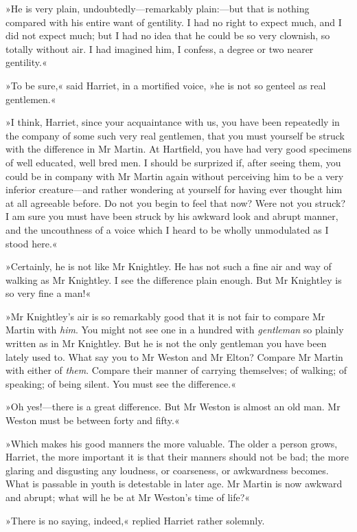 »He is very plain, undoubtedly—remarkably plain:—but that is nothing compared with his entire want of gentility. I had no right to expect much, and I did not expect much; but I had no idea that he could be so very clownish, so totally without air. I had imagined him, I confess, a degree or two nearer gentility.«

»To be sure,« said Harriet, in a mortified voice, »he is not so genteel as real gentlemen.«

»I think, Harriet, since your acquaintance with us, you have been repeatedly in the company of some such very real gentlemen, that you must yourself be struck with the difference in Mr Martin. At Hartfield, you have had very good specimens of well educated, well bred men. I should be surprized if, after seeing them, you could be in company with Mr Martin again without perceiving him to be a very inferior creature—and rather wondering at yourself for having ever thought him at all agreeable before. Do not you begin to feel that now? Were not you struck? I am sure you must have been struck by his awkward look and abrupt manner, and the uncouthness of a voice which I heard to be wholly unmodulated as I stood here.«

»Certainly, he is not like Mr Knightley. He has not such a fine air and way of walking as Mr Knightley. I see the difference plain enough. But Mr Knightley is so very fine a man!«

»Mr Knightley's air is so remarkably good that it is not fair to compare Mr Martin with \textit{him}. You might not see one in a hundred with \textit{gentleman} so plainly written as in Mr Knightley. But he is not the only gentleman you have been lately used to. What say you to Mr Weston and Mr Elton? Compare Mr Martin with either of \textit{them}. Compare their manner of carrying themselves; of walking; of speaking; of being silent. You must see the difference.«

»Oh yes!—there is a great difference. But Mr Weston is almost an old man. Mr Weston must be between forty and fifty.«

»Which makes his good manners the more valuable. The older a person grows, Harriet, the more important it is that their manners should not be bad; the more glaring and disgusting any loudness, or coarseness, or awkwardness becomes. What is passable in youth is detestable in later age. Mr Martin is now awkward and abrupt; what will he be at Mr Weston's time of life?«

»There is no saying, indeed,« replied Harriet rather solemnly.

